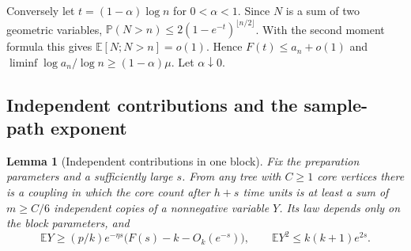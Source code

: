 \documentclass[11pt]{article}
\newtheorem{lemma}{Lemma}[section]
\theoremstyle{remark}
\numberwithin{equation}{section}
\newcommand{\E}{\mathbb E}
\newcommand{\Prob}{\mathbb P}
\begin{document}
Conversely let $t=(1-\alpha)\log n$ for $0<\alpha<1$. Since $N$ is a sum of two geometric variables, $\Prob(N>n)\le2(1-e^{-t})^{\lfloor n/2\rfloor}$. With the second moment formula this gives $\E[N;N>n]=o(1)$. Hence $F(t)\le a_n+o(1)$ and $\liminf\log a_n/\log n\ge(1-\alpha)\mu$. Let $\alpha\downarrow0$.

\subsection{Independent contributions and the sample-path exponent}
\begin{lemma}[Independent contributions in one block]\label{lem:block}
Fix the preparation parameters and a sufficiently large $s$. From any tree with $C\ge1$ core vertices there is a coupling in which the core count after $h+s$ time units is at least a sum of $m\ge C/6$ independent copies of a nonnegative variable $Y$. Its law depends only on the block parameters, and
\[
 \E Y\ge(p/k)e^{-\eta s}\big(F(s)-k-O_k(e^{-s})\big),\qquad
 \E Y^2\le k(k+1)e^{2s}.
\]
\end{lemma}
\end{document}
